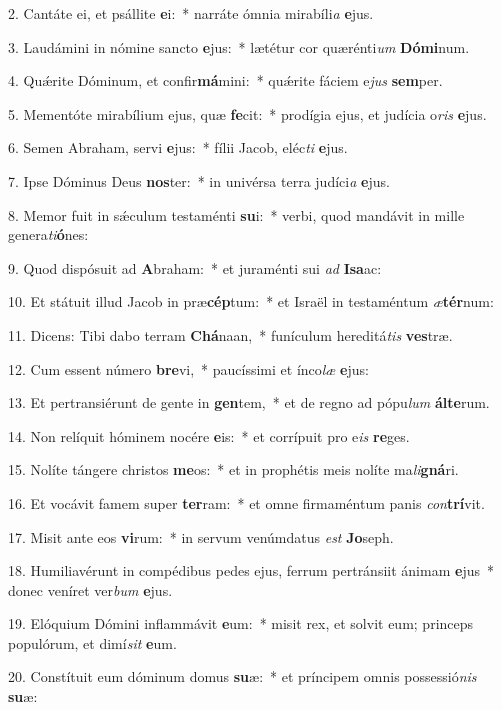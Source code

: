 2. Cantáte ei, et psállite \textbf{e}i:~*  narráte ómnia mirabíli\textit{a} \textbf{e}jus.\

3. Laudámini in nómine sancto \textbf{e}jus:~*  lætétur cor quærénti\textit{um} \textbf{Dó}\textbf{mi}num.\

4. Quǽrite Dóminum, et confir\textbf{má}mini:~*  quǽrite fáciem e\textit{jus} \textbf{sem}per.\

5. Mementóte mirabílium ejus, quæ \textbf{fe}cit:~*  prodígia ejus, et judícia o\textit{ris} \textbf{e}jus.\

6. Semen Abraham, servi \textbf{e}jus:~*  fílii Jacob, eléc\textit{ti} \textbf{e}jus.\

7. Ipse Dóminus Deus \textbf{nos}ter:~*  in univérsa terra judíci\textit{a} \textbf{e}jus.\

8. Memor fuit in sǽculum testaménti \textbf{su}i:~*  verbi, quod mandávit in mille genera\textit{ti}\textbf{ó}nes:\

9. Quod dispósuit ad \textbf{A}braham:~*  et juraménti sui \textit{ad} \textbf{I}\textbf{sa}ac:\

10. Et státuit illud Jacob in præ\textbf{cép}tum:~*  et Israël in testaméntum \textit{æ}\textbf{tér}num:\

11. Dicens: Tibi dabo terram \textbf{Chá}naan,~*  funículum hereditá\textit{tis} \textbf{ves}træ.\

12. Cum essent número \textbf{bre}vi,~*  paucíssimi et ínco\textit{læ} \textbf{e}jus:\

13. Et pertransiérunt de gente in \textbf{gen}tem,~*  et de regno ad pópu\textit{lum} \textbf{ál}\textbf{te}rum.\

14. Non relíquit hóminem nocére \textbf{e}is:~*  et corrípuit pro e\textit{is} \textbf{re}ges.\

15. Nolíte tángere christos \textbf{me}os:~*  et in prophétis meis nolíte ma\textit{li}\textbf{gná}ri.\

16. Et vocávit famem super \textbf{ter}ram:~*  et omne firmaméntum panis \textit{con}\textbf{trí}vit.\

17. Misit ante eos \textbf{vi}rum:~*  in servum venúmdatus \textit{est} \textbf{Jo}seph.\

18. Humiliavérunt in compédibus pedes ejus, ferrum pertránsiit ánimam \textbf{e}jus~*  donec veníret ver\textit{bum} \textbf{e}jus.\

19. Elóquium Dómini inflammávit \textbf{e}um:~*  misit rex, et solvit eum; princeps populórum, et dimí\textit{sit} \textbf{e}um.\

20. Constítuit eum dóminum domus \textbf{su}æ:~*  et príncipem omnis possessió\textit{nis} \textbf{su}æ:\

